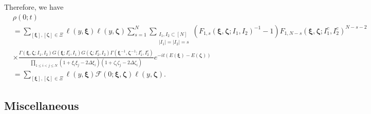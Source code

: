 \documentclass[a4paper,11pt]{article}
\theoremstyle{definition}
\begin{document}
Therefore, we have
\begin{equation}
\begin{split}
    &\rho(0;t)\\
    &= \sum_{[\boldsymbol{\xi}], [\boldsymbol{\zeta}] \in \Xi}\ell(y, \boldsymbol{\xi}) \ell(y, \boldsymbol{\zeta})\sum_{s = 1}^{N} \sum_{\substack{I_1, I_2 \subset [N]\\|I_1|=|I_2| = s}}  ( F_{1, s}(\boldsymbol{\xi}, \boldsymbol{\zeta}; I_1, I_2)^{-1}-1)F_{1, N-s}(\boldsymbol{\xi}, \boldsymbol{\zeta}; I_1^c, I_2^c)^{N-s-2}\\
    &\times \frac{\Gamma(\boldsymbol{\xi}, \boldsymbol{\zeta}; I_1, I_2)G(\boldsymbol{\xi}; I_1^c, I_1)G(\boldsymbol{\zeta}; I_2^c, I_2)\Gamma(\boldsymbol{\xi}^{-1}, \boldsymbol{\zeta}^{-1}; I_1^c, I_2^c)}{\prod_{1 \leq i <j \leq N}(1 + \xi_i \xi_j - 2 \Delta \xi_i)(1 + \zeta_i \zeta_j - 2 \Delta \zeta_i)} e^{-it(E(\boldsymbol{\xi})-E(\boldsymbol{\zeta}))}\\
     &= \sum_{[\boldsymbol{\xi}],[\boldsymbol{\zeta}]\in\Xi}\ell(y,\boldsymbol{\xi})\mathcal{F}(0;\boldsymbol{\xi},\boldsymbol{\zeta})\ell(y,\boldsymbol{\zeta}).
\end{split}
\end{equation}



\subsection{Miscellaneous}
\end{document}
